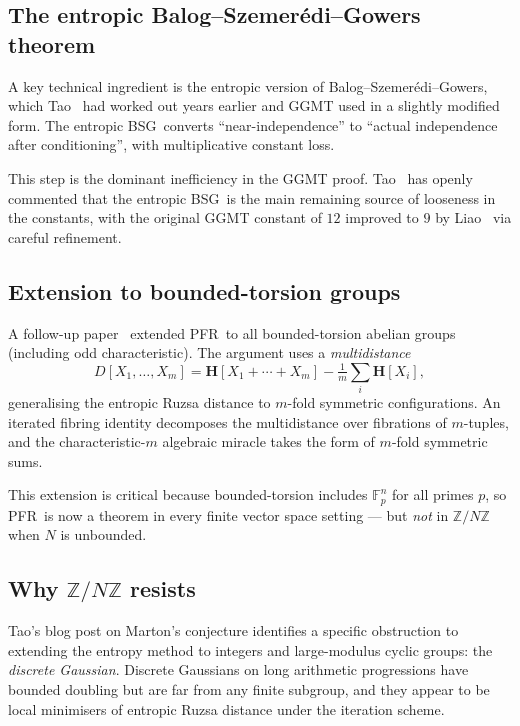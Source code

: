\documentclass[11pt,a4paper]{article}
\theoremstyle{plain}
\theoremstyle{definition}
\theoremstyle{remark}
\newcommand{\F}{\mathbb{F}}
\newcommand{\Z}{\mathbb{Z}}
\newcommand{\entropy}{\mathbf{H}}
\newcommand{\PFR}{\textsf{PFR}}
\newcommand{\BSG}{\textsf{BSG}}
\begin{document}
\subsection{The entropic Balog--Szemer\'edi--Gowers theorem}

A key technical ingredient is the entropic version of Balog--Szemer\'edi--Gowers, which Tao~\cite{tao2010} had worked out years earlier and GGMT used in a slightly modified form. The entropic \BSG\ converts ``near-independence'' to ``actual independence after conditioning'', with multiplicative constant loss.

This step is the dominant inefficiency in the GGMT proof. Tao~\cite{tao2024abridged} has openly commented that the entropic \BSG\ is the main remaining source of looseness in the constants, with the original GGMT constant of $12$ improved to $9$ by Liao~\cite{liao2024} via careful refinement.

\subsection{Extension to bounded-torsion groups}

A follow-up paper~\cite{ggmt2024} extended \PFR\ to all bounded-torsion abelian groups (including odd characteristic). The argument uses a \emph{multidistance}
\[
D[X_1, \ldots, X_m] = \entropy[X_1 + \cdots + X_m] - \tfrac{1}{m}\sum_i \entropy[X_i],
\]
generalising the entropic Ruzsa distance to $m$-fold symmetric configurations. An iterated fibring identity decomposes the multidistance over fibrations of $m$-tuples, and the characteristic-$m$ algebraic miracle takes the form of $m$-fold symmetric sums.

This extension is critical because bounded-torsion includes $\F_p^n$ for all primes $p$, so \PFR\ is now a theorem in every finite vector space setting --- but \emph{not} in $\Z/N\Z$ when $N$ is unbounded.

\subsection{Why $\Z/N\Z$ resists}

Tao's blog post on Marton's conjecture identifies a specific obstruction to extending the entropy method to integers and large-modulus cyclic groups: the \emph{discrete Gaussian}. Discrete Gaussians on long arithmetic progressions have bounded doubling but are far from any finite subgroup, and they appear to be local minimisers of entropic Ruzsa distance under the iteration scheme.
\end{document}
